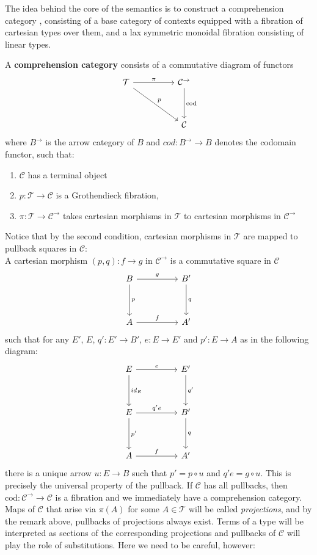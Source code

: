 The idea behind the core of the semantics is to construct a comprehension category \cite{jacobs}, consisting of a base category of contexts equipped with a fibration of cartesian types over them, and a lax symmetric monoidal fibration consisting of linear types.
\begin{defn}
A \textbf{comprehension category} consists of a commutative diagram of functors
\[
\ti
\mathcal{T} \ar[rd, "p"] \ar[r, "\pi"]  & \mathcal{C}^{\to} \ar[d, "\text{cod}"]\\
& \mathcal{C}
\kz
\]
where $B^\to$ is the arrow category of $B$ and $cod : B^\to \to B$ denotes the codomain functor, such that:
\begin{enumerate}
\item $\mathcal{C}$ has a terminal object
\item $p : \mathcal{T} \to \mathcal{C}$ is a Grothendieck fibration,
\item $\pi : \mathcal{T} \to \mathcal{C}^\to$ takes cartesian morphisms in $\mathcal{T}$ to cartesian morphisms in $\mathcal{C}^\to$
\end{enumerate}
Notice that by the second condition, cartesian morphisms in $\mathcal{T}$ are mapped to pullback squares in $\mathcal{C}$:\\
A cartesian morphism $(p, q) : f \to g$ in $\mathcal{C}^\to$ is a commutative square in $\mathcal{C}$
\[
\ti
B \ar[r, "g"] \ar[d, "p"] & B' \ar[d, "q"]\\
A \ar[r,"f"] & A'
\kz
\]
such that for any $E'$, $E$, $q' : E' \to B'$, $e : E \to E'$ and $p' : E \to A$ as in the following diagram:
\[
\ti
E \ar[d, "id_E"] \ar[r, "e"] & E' \ar[d, "q'"] \\
E \ar[d, "p'"] \ar[r, "q'e"] & B' \ar[d,"q"] \\
A \ar[r, "f"] & A'
\kz
\]
there is a unique arrow $u : E \to B$ such that $p' = p \circ u$ and $q'e = g \circ u$. This is precisely the universal property of the pullback.
If $\mathcal{C}$ has all pullbacks, then $\text{cod} : \mathcal{C}^\to \to \mathcal{C}$ is a fibration and we immediately have a comprehension category.
Maps of $\mathcal{C}$ that arise via $\pi(A)$ for some $A \in \mathcal{T}$ will be called \textit{projections}, and by the remark above, pullbacks of projections always exist. Terms of a type will be interpreted as sections of the corresponding projections and pullbacks of $\mathcal{C}$ will play the role of substitutions. Here we need to be careful, however:
\end{defn}
